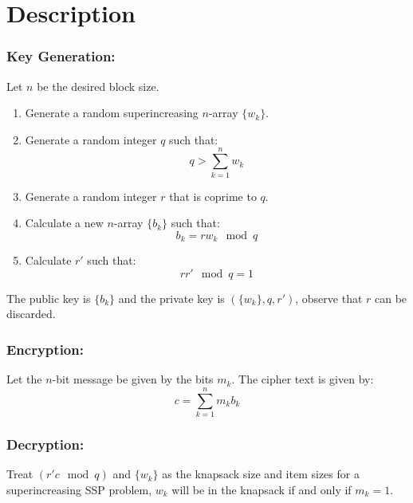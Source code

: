 
\section{Description}

\subsubsection{Key Generation:}
Let $n$ be the desired block size.
\begin{enumerate}
	\item Generate a random superincreasing $n$-array $\{w_k\}$.
\item Generate a random integer $q$ such that:
	\[q > \sum_{k=1}^nw_k\]
\item Generate a random integer $r$ that is coprime to $q$.
\item Calculate a new $n$-array $\{b_k\}$ such that:
	\[b_k = rw_k \mod q\]
\item Calculate $r'$ such that:
	\[rr' \mod q = 1\]
\end{enumerate}
The public key is $\{b_k\}$ and the private key is $(\{w_k\},q,r')$,
observe that $r$ can be discarded.

\subsubsection{Encryption:}
Let the $n$-bit message be given by the bits $m_k$.
The cipher text is given by:
\[c = \sum_{k=1}^nm_kb_k\]

\subsubsection{Decryption:}
Treat $(r'c\mod q)$ and $\{w_k\}$ as the knapsack size and item sizes for a superincreasing SSP problem,
$w_k$ will be in the knapsack if and only if $m_k=1$.
